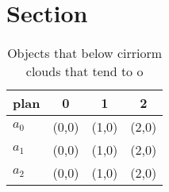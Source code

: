 \documentclass[a4paper]{article}
\begin{document}
\section{Section}

\begin{table}
\begin{adjustbox}{width=0.6\columnwidth}
\begin{tabular}{|l|l|l|l|}
\hline
\textbf{plan} & \multicolumn{1}{c|}{\textbf{0}} & \multicolumn{1}{c|}{\textbf{1}} & \multicolumn{1}{c|}{\textbf{2}} \\ \hline
\textbf{$a_0$}  & (0,0) & (1,0) & (2,0) \\ \hline
\textbf{$a_1$}  & (0,0) & (1,0) & (2,0) \\ \hline
\textbf{$a_2$}  & (0,0) & (1,0) & (2,0) \\ \hline
\end{tabular}
\end{adjustbox}
\caption{Objects that below cirriorm clouds that tend to o
}
\end{table}
\end{document}
